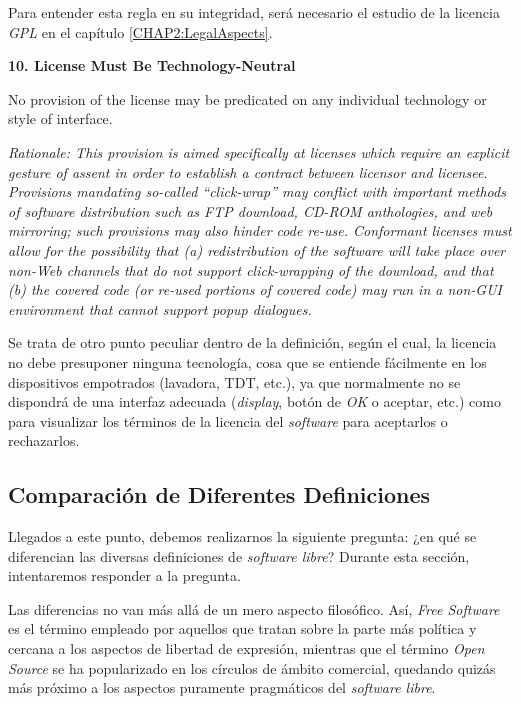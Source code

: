 Para entender esta regla en su integridad, será necesario el estudio de la
licencia \textit{GPL} en el capítulo \ref{CHAP2:LegalAspects}.\vspace{0.4cm}

{\bf 10. License Must Be Technology-Neutral

No provision of the license may be predicated on any individual technology or
style of interface.}

\textit{Rationale: This provision is aimed specifically at licenses which
require an explicit gesture of assent in order to establish a contract between
licensor and licensee. Provisions mandating so-called ``click-wrap'' may
conflict with important methods of software distribution such as FTP download,
CD-ROM anthologies, and web mirroring; such provisions may also hinder code
re-use. Conformant licenses must allow for the possibility that (a)
redistribution of the software will take place over non-Web channels that do not
support click-wrapping of the download, and that (b) the covered code (or
re-used portions of covered code) may run in a non-GUI environment that cannot
support popup dialogues.}\vspace{0.4cm}

Se trata de otro punto peculiar dentro de la definición, según el cual, la
licencia no debe presuponer ninguna tecnología, cosa que se entiende
fácilmente en los dispositivos empotrados (lavadora, TDT, etc.), ya que
normalmente no se dispondrá de una interfaz adecuada (\textit{display}, botón de
\textit{OK} o aceptar, etc.) como para visualizar los términos de la licencia
del \textit{software} para aceptarlos o rechazarlos.

\subsection{Comparación de Diferentes Definiciones}

Llegados a este punto, debemos realizarnos la siguiente pregunta: ¿en qué se
diferencian las diversas definiciones de \textit{software libre}? Durante esta
sección, intentaremos responder a la pregunta.

Las diferencias no van más allá de un mero aspecto filosófico. Así, \textit{Free
Software} es el término empleado por aquellos que tratan sobre la parte más
política y cercana a los aspectos de libertad de expresión, mientras que el
término \textit{Open Source} se ha popularizado en los círculos de ámbito
comercial, quedando quizás más próximo a los aspectos puramente pragmáticos del
\textit{software libre}.

